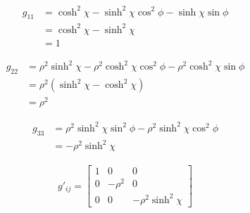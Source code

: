 \documentclass{article}
\begin{document}
\begin{align*}
  g _{11 }  &= \cosh ^ {2 }\chi - \sinh ^2 \chi \cos ^2{\phi} - \sinh{\chi }\sin{\phi }\\
  &= \cosh ^2 \chi - \sinh ^2 \chi \\
  &= 1
\end{align*}

\begin{align*}
  g _{22 }  &= \rho ^2\sinh ^ {2 }\chi - \rho ^2\cosh ^2 \chi \cos ^2{\phi} - \rho ^2\cosh ^2{\chi }\sin{\phi }\\
  &= \rho ^2(\sinh ^2 \chi-\cosh ^2 \chi) \\
  &= \rho ^2 
\end{align*}

\begin{align*}
  g _{33 }  &= \rho ^2\sinh ^ {2 }\chi\sin ^2 \phi  - \rho ^2\sinh ^2 \chi \cos ^2{\phi}\\
  &= - \rho ^2 \sinh ^2\chi
\end{align*}

\begin{gather*}
  g' _{ij }  = \begin{bmatrix}
      1 & 0 & 0 \\
      0 & -\rho ^2 & 0 \\
      0 & 0 & -\rho ^2 \sinh ^2\chi
  \end{bmatrix}
\end{gather*}
\end{document}
